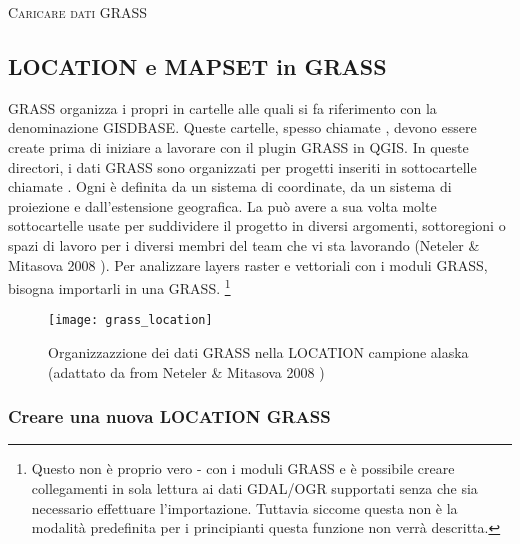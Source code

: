 \begin{Tip}\caption{\textsc{Caricare dati GRASS}}
\end{Tip} 

\subsection{LOCATION e MAPSET in GRASS}\label{sec:about_loc}

GRASS organizza i propri in cartelle alle quali si fa riferimento con la
denominazione GISDBASE. Queste cartelle, spesso chiamate ,
devono essere create prima di iniziare a lavorare con il plugin GRASS in QGIS.
In queste directori, i dati GRASS sono organizzati per progetti inseriti in
sottocartelle chiamate . 
Ogni  è definita da un sistema di coordinate, da un sistema
di proiezione e dall'estensione geografica. La  può avere a
sua volta molte sottocartelle  usate per suddividere il
progetto in diversi argomenti, sottoregioni o spazi di lavoro per i diversi
membri del team che vi sta lavorando (Neteler \& Mitasova 2008
\cite{neteler_mitasova08}). Per analizzare layers raster e vettoriali con i
moduli GRASS, bisogna importarli in una  GRASS.
\footnote{Questo non è proprio vero - con i moduli GRASS 
e  è possibile creare collegamenti in sola lettura ai
dati GDAL/OGR supportati senza che sia necessario effettuare l'importazione.
Tuttavia siccome questa non è la modalità predefinita per i principianti
questa funzione non verrà descritta.}

\begin{figure}[ht]
\begin{center}
\caption{Organizzazzione dei dati GRASS nella LOCATION campione alaska
(adattato da from Neteler \& Mitasova 2008 \cite{neteler_mitasova08})}\label{fig:grass_location}\smallskip
\texttt{[image: grass\_location]}
\end{center}  
\end{figure}

\subsubsection{Creare una nuova LOCATION GRASS}\label{sec:create_loc}

